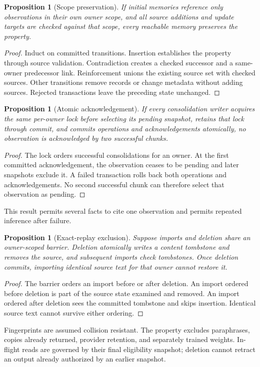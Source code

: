 \documentclass[11pt]{article}
\newtheorem{proposition}[theorem]{Proposition}
\begin{document}
\begin{proposition}[Scope preservation]
If initial memories reference only observations in their own owner scope, and all source additions and update targets are checked against that scope, every reachable memory preserves the property.
\end{proposition}
\begin{proof}
Induct on committed transitions. Insertion establishes the property through source validation. Contradiction creates a checked successor and a same-owner predecessor link. Reinforcement unions the existing source set with checked sources. Other transitions remove records or change metadata without adding sources. Rejected transactions leave the preceding state unchanged.
\end{proof}

\begin{proposition}[Atomic acknowledgement]
If every consolidation writer acquires the same per-owner lock before selecting its pending snapshot, retains that lock through commit, and commits operations and acknowledgements atomically, no observation is acknowledged by two successful chunks.
\end{proposition}
\begin{proof}
The lock orders successful consolidations for an owner. At the first committed acknowledgement, the observation ceases to be pending and later snapshots exclude it. A failed transaction rolls back both operations and acknowledgements. No second successful chunk can therefore select that observation as pending.
\end{proof}
This result permits several facts to cite one observation and permits repeated inference after failure.

\begin{proposition}[Exact-replay exclusion]
Suppose imports and deletion share an owner-scoped barrier. Deletion atomically writes a content tombstone and removes the source, and subsequent imports check tombstones. Once deletion commits, importing identical source text for that owner cannot restore it.
\end{proposition}
\begin{proof}
The barrier orders an import before or after deletion. An import ordered before deletion is part of the source state examined and removed. An import ordered after deletion sees the committed tombstone and skips insertion. Identical source text cannot survive either ordering.
\end{proof}
Fingerprints are assumed collision resistant. The property excludes paraphrases, copies already returned, provider retention, and separately trained weights. In-flight reads are governed by their final eligibility snapshot; deletion cannot retract an output already authorized by an earlier snapshot.
\end{document}
